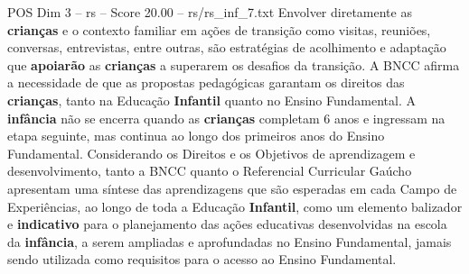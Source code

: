\begin{textsample}{POS Dim 3 – rs – Score 20.00 – rs/rs\_inf\_7.txt}
Envolver diretamente as \textbf{crianças} e o contexto familiar em ações de transição como visitas, reuniões, conversas, entrevistas, entre outras, são estratégias de acolhimento e adaptação que \textbf{apoiarão} as \textbf{crianças} a superarem os desafios da transição.
A BNCC afirma a necessidade de que as propostas pedagógicas garantam os direitos das \textbf{crianças}, tanto na Educação \textbf{Infantil} quanto no Ensino Fundamental.
A \textbf{infância} não se encerra quando as \textbf{crianças} completam 6 anos e ingressam na etapa seguinte, mas continua ao longo dos primeiros anos do Ensino Fundamental.
Considerando os Direitos e os Objetivos de aprendizagem e desenvolvimento, tanto a BNCC quanto o Referencial Curricular Gaúcho apresentam uma síntese das aprendizagens que são esperadas em cada Campo de Experiências, ao longo de toda a Educação \textbf{Infantil}, como um elemento balizador e \textbf{indicativo} para o planejamento das ações educativas desenvolvidas na escola da \textbf{infância}, a serem ampliadas e aprofundadas no Ensino Fundamental, jamais sendo utilizada como requisitos para o acesso ao Ensino Fundamental.

\end{textsample}
